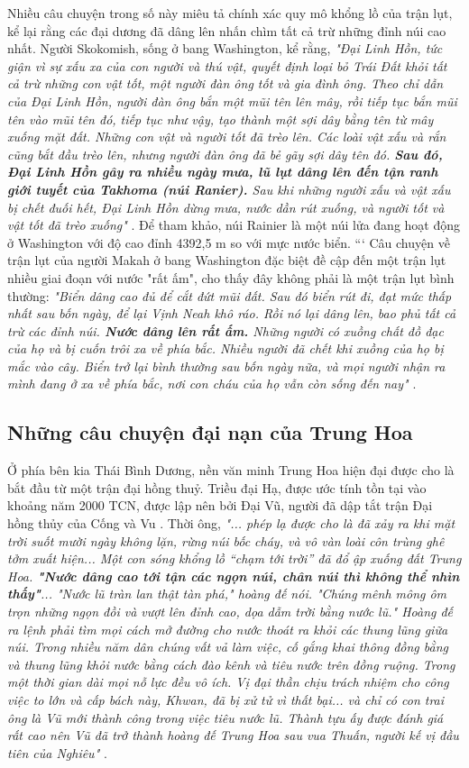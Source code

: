 \documentclass[10pt,twocolumn,letterpaper]{article}
\begin{document}
Nhiều câu chuyện trong số này miêu tả chính xác quy mô khổng lồ của trận lụt, kể lại rằng các đại dương đã dâng lên nhấn chìm tất cả trừ những đỉnh núi cao nhất. Người Skokomish, sống ở bang Washington, kể rằng, \textit{"Đại Linh Hồn, tức giận vì sự xấu xa của con người và thú vật, quyết định loại bỏ Trái Đất khỏi tất cả trừ những con vật tốt, một người đàn ông tốt và gia đình ông. Theo chỉ dẫn của Đại Linh Hồn, người đàn ông bắn một mũi tên lên mây, rồi tiếp tục bắn mũi tên vào mũi tên đó, tiếp tục như vậy, tạo thành một sợi dây bằng tên từ mây xuống mặt đất. Những con vật và người tốt đã trèo lên. Các loài vật xấu và rắn cũng bắt đầu trèo lên, nhưng người đàn ông đã bẻ gãy sợi dây tên đó. \textbf{Sau đó, Đại Linh Hồn gây ra nhiều ngày mưa, lũ lụt dâng lên đến tận ranh giới tuyết của Takhoma (núi Ranier).} Sau khi những người xấu và vật xấu bị chết đuối hết, Đại Linh Hồn dừng mưa, nước dần rút xuống, và người tốt và vật tốt đã trèo xuống"} \cite{3}. Để tham khảo, núi Rainier là một núi lửa đang hoạt động ở Washington với độ cao đỉnh 4392,5 m so với mực nước biển.
```
Câu chuyện về trận lụt của người Makah ở bang Washington đặc biệt đề cập đến một trận lụt nhiều giai đoạn với nước "rất ấm", cho thấy đây không phải là một trận lụt bình thường: \textit{"Biển dâng cao đủ để cắt đứt mũi đất. Sau đó biển rút đi, đạt mức thấp nhất sau bốn ngày, để lại Vịnh Neah khô ráo. Rồi nó lại dâng lên, bao phủ tất cả trừ các đỉnh núi. \textbf{Nước dâng lên rất ấm.} Những người có xuồng chất đồ đạc của họ và bị cuốn trôi xa về phía bắc. Nhiều người đã chết khi xuồng của họ bị mắc vào cây. Biển trở lại bình thường sau bốn ngày nữa, và mọi người nhận ra mình đang ở xa về phía bắc, nơi con cháu của họ vẫn còn sống đến nay"} \cite{3}.

\subsection{Những câu chuyện đại nạn của Trung Hoa}

Ở phía bên kia Thái Bình Dương, nền văn minh Trung Hoa hiện đại được cho là bắt đầu từ một trận đại hồng thuỷ. Triều đại Hạ, được ước tính tồn tại vào khoảng năm 2000 TCN, được lập nên bởi Đại Vũ, người đã dập tắt trận Đại hồng thủy của Cống và Vu \cite{6}. Thời ông, \textit{"... phép lạ được cho là đã xảy ra khi mặt trời suốt mười ngày không lặn, rừng núi bốc cháy, và vô vàn loài côn trùng ghê tởm xuất hiện... Một con sóng khổng lồ “chạm tới trời” đã đổ ập xuống đất Trung Hoa. \textbf{"Nước dâng cao tới tận các ngọn núi, chân núi thì không thể nhìn thấy"}... "Nước lũ tràn lan thật tàn phá," hoàng đế nói. "Chúng mênh mông ôm trọn những ngọn đồi và vượt lên đỉnh cao, dọa dẫm trời bằng nước lũ." Hoàng đế ra lệnh phải tìm mọi cách mở đường cho nước thoát ra khỏi các thung lũng giữa núi. Trong nhiều năm dân chúng vất vả làm việc, cố gắng khai thông đồng bằng và thung lũng khỏi nước bằng cách đào kênh và tiêu nước trên đồng ruộng. Trong một thời gian dài mọi nỗ lực đều vô ích. Vị đại thần chịu trách nhiệm cho công việc to lớn và cấp bách này, Khwan, đã bị xử tử vì thất bại... và chỉ có con trai ông là Vũ mới thành công trong việc tiêu nước lũ. Thành tựu ấy được đánh giá rất cao nên Vũ đã trở thành hoàng đế Trung Hoa sau vua Thuấn, người kế vị đầu tiên của Nghiêu"} \cite{5}.
\end{document}

